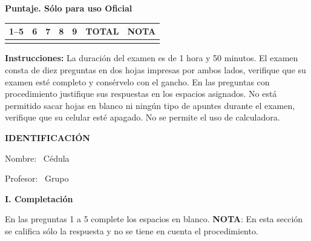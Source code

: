 \documentclass[11pt]{article}
\begin{document}
\examheader

\vspace{4pt}
\noindent
\begin{minipage}[t]{0.62\linewidth}
\textbf{Puntaje. Sólo para uso Oficial}\\[4pt]
\begin{tabular}{|c|c|c|c|c|c|c|}
\hline
1--5 & 6 & 7 & 8 & 9 & \textbf{TOTAL} & \textbf{NOTA} \\ \hline
 & & & & & & \\ \hline
\end{tabular}
\end{minipage}

\vspace{6pt}
\noindent\textbf{Instrucciones:} La duración del examen es de 1 hora y 50 minutos. El examen consta de diez preguntas en dos hojas impresas por ambos lados, verifique que su examen esté completo y consérvelo con el gancho. En las preguntas con procedimiento justifique sus respuestas en los espacios asignados. No está permitido sacar hojas en blanco ni ningún tipo de apuntes durante el examen, verifique que su celular esté apagado. No se permite el uso de calculadora.

\vspace{6pt}
\noindent\textbf{IDENTIFICACIÓN}

\vspace{8pt}
\noindent Nombre: \dotfill\ Cédula \dotfill

\vspace{4pt}
\noindent Profesor: \dotfill\ Grupo \dotfill

\vspace{10pt}
\begin{center}\textbf{I. Completación}\end{center}
\noindent En las preguntas 1 a 5 complete los espacios en blanco. \textbf{NOTA}: En esta sección se califica sólo la respuesta y no se tiene en cuenta el procedimiento.
\end{document}
